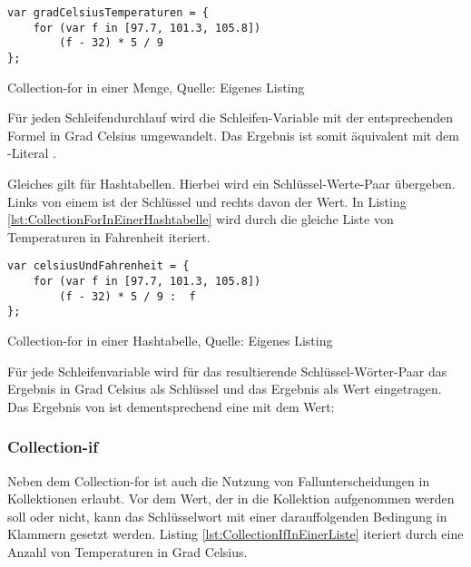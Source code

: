 \ifIncludeFigures
  \begin{listing}[ht]
    \begin{verbatim}
var gradCelsiusTemperaturen = {
    for (var f in [97.7, 101.3, 105.8])
        (f - 32) * 5 / 9
};
\end{verbatim}
    \caption[Collection-for in einer Menge]{Collection-for in einer Menge, Quelle: Eigenes Listing}
    \label{lst:CollectionForInEinerMenge}
  \end{listing}
\fi

Für jeden Schleifendurchlauf wird die Schleifen-Variable  mit der entsprechenden Formel in Grad Celsius umgewandelt.
Das Ergebnis ist somit äquivalent mit dem -Literal .



Gleiches gilt für Hashtabellen.
Hierbei wird ein Schlüssel-Werte-Paar übergeben.
Links von einem \IC{:} ist der Schlüssel und rechts davon der Wert.
In Listing \ref{lst:CollectionForInEinerHashtabelle}
wird durch  die gleiche Liste von Temperaturen in Fahrenheit iteriert.


\ifIncludeFigures
  \begin{listing}[ht]
    \begin{verbatim}
var celsiusUndFahrenheit = {
    for (var f in [97.7, 101.3, 105.8])
        (f - 32) * 5 / 9 :  f
};
\end{verbatim}
    \caption[Collection-for in einer Hashtabelle]{Collection-for in einer Hashtabelle, Quelle: Eigenes Listing}
    \label{lst:CollectionForInEinerHashtabelle}
  \end{listing}
\fi

 Für jede Schleifenvariable  wird für das resultierende Schlüssel-Wörter-Paar das Ergebnis in Grad Celsius als Schlüssel und das Ergebnis als Wert eingetragen.
Das Ergebnis von  ist dementsprechend eine  mit dem Wert: 



\subsubsection{Collection-if}

Neben dem Collection-for ist auch die Nutzung von Fallunterscheidungen in Kollektionen erlaubt.
Vor dem Wert, der in die Kollektion aufgenommen werden soll oder nicht,  kann  das Schlüsselwort  mit einer darauffolgenden Bedingung in Klammern gesetzt werden.
Listing \ref{lst:CollectionIfInEinerListe} iteriert durch eine Anzahl von Temperaturen in Grad Celsius.


